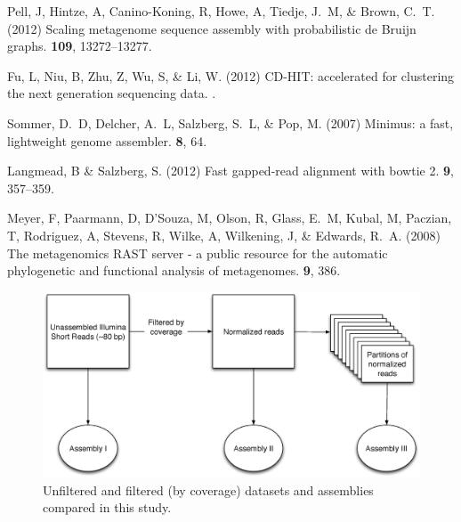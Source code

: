 \documentclass{pnastwo}
\begin{document}
\begin{article}
\begin{thebibliography}{1}
Pell, J, Hintze, A, Canino-Koning, R, Howe, A, Tiedje, J.~M,  \& Brown, C.~T.
\newblock (2012) {Scaling metagenome sequence assembly with probabilistic de
  Bruijn graphs}.
 {\bf 109}, 13272--13277.

Fu, L, Niu, B, Zhu, Z, Wu, S,  \& Li, W.
\newblock (2012) {CD-HIT: accelerated for clustering the next generation
  sequencing data.}
.

Sommer, D.~D, Delcher, A.~L, Salzberg, S.~L,  \& Pop, M.
\newblock (2007) Minimus: a fast, lightweight genome assembler.
 {\bf 8}, 64.

Langmead, B \& Salzberg, S.
\newblock (2012) Fast gapped-read alignment with bowtie 2.
 {\bf 9}, 357--359.

Meyer, F, Paarmann, D, D'Souza, M, Olson, R, Glass, E.~M, Kubal, M, Paczian, T,
  Rodriguez, A, Stevens, R, Wilke, A, Wilkening, J,  \& Edwards, R.~A.
\newblock (2008) {The metagenomics RAST server - a public resource for the
  automatic phylogenetic and functional analysis of metagenomes.}
 {\bf 9}, 386.

\end{thebibliography}

\end{article}

\renewcommand{\thepage}{S\arabic{page}}  
\renewcommand{\thesection}{S\arabic{section}}   
\renewcommand{\thetable}{S\arabic{table}}   
\renewcommand{\thefigure}{S\arabic{figure}}


\begin{figure}
\centerline{\includegraphics[width=.7\textwidth]{./figures/new_flowchart.eps}}
\caption{Unfiltered and filtered (by coverage) datasets and assemblies compared in this study.}
\label{flowchart}
\end{figure}
\end{document}

